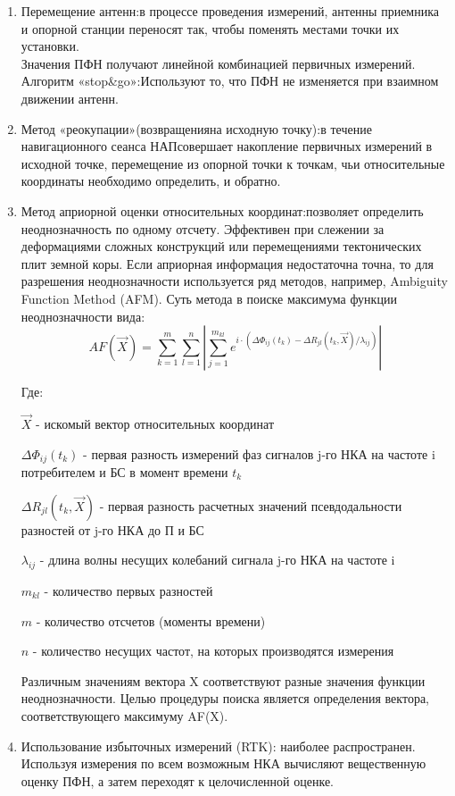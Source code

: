 \documentclass[14pt,a4paper,oneside]{extarticle}
\begin{document}
\begin{enumerate}
    \item Перемещение антенн:в процессе проведения измерений, антенны приемника и опорной станции переносят так, чтобы поменять местами точки их установки.\\
          Значения ПФН получают линейной комбинацией первичных измерений.\\
          Алгоритм «stop\&go»:Используют то, что ПФН не изменяется при взаимном движении антенн.
    \item Метод «реокупации»(возвращенияна исходную точку):в течение навигационного сеанса НАПсовершает накопление первичных измерений в исходной точке, перемещение из опорной точки к точкам, чьи относительные координаты необходимо определить, и обратно.
    \item Метод априорной оценки относительных координат:позволяет определить неоднозначность по одному отсчету. Эффективен при слежении за деформациями сложных конструкций или перемещениями тектонических плит земной коры. Если априорная информация недостаточна точна, то для разрешения неоднозначности используется ряд методов, например, Ambiguity Function Method (AFM). Суть метода в поиске максимума функции неоднозначности вида: \[AF(\vec{X})=\sum_{k=1}^{m}\sum_{l=1}^{n}\left|\sum_{j=1}^{m_{kl}}e^{i\cdot\left(\Delta\Phi_{ij}(t_k)-\Delta R_{jl}(t_k,\vec{X})/\lambda_{ij}\right)}\right|\] 
    
    Где:

    $\vec{X}$ - искомый вектор относительных координат

    $\Delta\Phi_{ij}(t_k)$ - первая разность измерений фаз сигналов j-го НКА на частоте i потребителем и БС в момент времени $t_k$

    $\Delta R_{jl}(t_k,\vec{X})$ - первая разность расчетных значений псевдодальности разностей от j-го НКА до П и БС

    $\lambda_{ij}$ - длина волны несущих колебаний сигнала j-го НКА на частоте i

    $m_{kl}$ - количество первых разностей

    $m$ - количество отсчетов (моменты времени)

    $n$ - количество несущих частот, на которых производятся измерения

    Различным значениям вектора X соответствуют разные значения функции неоднозначности. Целью процедуры поиска является определения вектора, соответствующего максимуму AF(X).
    \item Использование избыточных измерений (RTK): наиболее распространен. Используя измерения по всем возможным НКА вычисляют вещественную оценку ПФН, а затем переходят к целочисленной оценке.
\end{enumerate}
\end{document}

